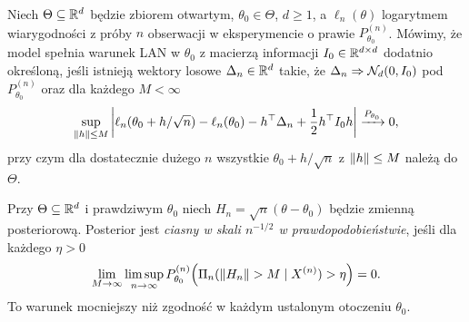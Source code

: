 \begin{definicja}
\label{def:lan}
Niech $\Theta\subseteq\mathbb R^d$ będzie zbiorem otwartym,
$\theta_0\in\Theta$, $d\ge1$, a $\ell_n(\theta)$
logarytmem wiarygodności z próby $n$ obserwacji
w eksperymencie o prawie $P_{\theta_0}^{(n)}$.
Mówimy, że model spełnia warunek LAN w $\theta_0$
z macierzą informacji $I_0\in\mathbb R^{d\times d}$ dodatnio
określoną, jeśli istnieją wektory losowe $\Delta_n\in\mathbb R^d$
takie, że $\Delta_n\Rightarrow\mathcal N_d(0,I_0)$ pod
$P_{\theta_0}^{(n)}$ oraz dla każdego $M<\infty$
\[
 \sup_{\lVert h\rVert\le M}\left|
 \ell_n(\theta_0+h/\sqrt n)-\ell_n(\theta_0)
 -h^\top\Delta_n+\frac12h^\top I_0h\right|
 \xrightarrow{P_{\theta_0}}0,
\]
przy czym dla dostatecznie dużego $n$ wszystkie
$\theta_0+h/\sqrt n$ z $\lVert h\rVert\le M$ należą do $\Theta$.
\end{definicja}

\begin{definicja}
\label{def:root-n-tightness}
Przy $\Theta\subseteq\mathbb R^d$ i prawdziwym $\theta_0$
niech $H_n=\sqrt n(\theta-\theta_0)$ będzie zmienną
posteriorową. Posterior jest \emph{ciasny w skali $n^{-1/2}$
w prawdopodobieństwie}, jeśli dla każdego $\eta>0$
\[
 \lim_{M\to\infty}\limsup_{n\to\infty}
 P_{\theta_0}^{(n)}\!\left(
 \Pi_n(\lVert H_n\rVert>M\mid X^{(n)})>\eta\right)=0.
\]
To warunek mocniejszy niż zgodność w każdym ustalonym
otoczeniu $\theta_0$.
\end{definicja}

